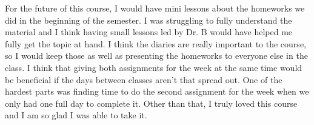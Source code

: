 \documentclass[12pt, letterpaper]{article}
\begin{document}
For the future of this course, I would have mini lessons about the homeworks we did in the beginning of the semester.  I was struggling to fully understand the material and I think having small lessons led by Dr. B would have helped me fully get the topic at hand.  I think the diaries are really important to the course, so I would keep those as well as presenting the homeworks to everyone else in the class.  I think that giving both assignments for the week at the same time would be beneficial if the days between classes aren't that spread out.  One of the hardest parts was finding time to do the second assignment for the week when we only had one full day to complete it.  Other than that, I truly loved this course and I am so glad I was able to take it.  
\end{document}
